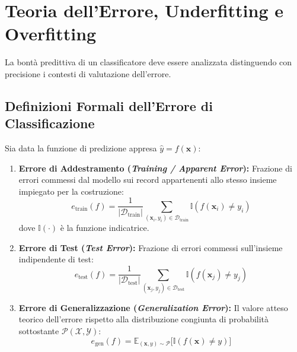 \FloatBarrier
\section{Teoria dell'Errore, Underfitting e Overfitting}
\label{sec:dm-error-underfitting-overfitting}

La bontà predittiva di un classificatore deve essere analizzata distinguendo con precisione i contesti di valutazione dell'errore.

\FloatBarrier
\subsection{Definizioni Formali dell'Errore di Classificazione}
\label{subsec:dm-error-formal-definitions}

Sia data la funzione di predizione appresa $\hat{y} = f(\mathbf{x})$:
\begin{enumerate}
    \item \textbf{Errore di Addestramento (\textit{Training / Apparent Error}):}
    Frazione di errori commessi dal modello sui record appartenenti allo stesso insieme impiegato per la costruzione:
    \begin{equation}
        e_{\text{train}}(f) = \frac{1}{|\mathcal{D}_{\text{train}}|} \sum_{(\mathbf{x}_i, y_i) \in \mathcal{D}_{\text{train}}} \mathbb{I}(f(\mathbf{x}_i) \ne y_i)
    \end{equation}
    dove $\mathbb{I}(\cdot)$ è la funzione indicatrice.
    
    \item \textbf{Errore di Test (\textit{Test Error}):}
    Frazione di errori commessi sull'insieme indipendente di test:
    \begin{equation}
        e_{\text{test}}(f) = \frac{1}{|\mathcal{D}_{\text{test}}|} \sum_{(\mathbf{x}_j, y_j) \in \mathcal{D}_{\text{test}}} \mathbb{I}(f(\mathbf{x}_j) \ne y_j)
    \end{equation}
    
    \item \textbf{Errore di Generalizzazione (\textit{Generalization Error}):}
    Il valore atteso teorico dell'errore rispetto alla distribuzione congiunta di probabilità sottostante $\mathcal{P}(\mathcal{X}, \mathcal{Y})$:
    \begin{equation}
        e_{\text{gen}}(f) = \mathbb{E}_{(\mathbf{x}, y) \sim \mathcal{P}}\big[ \mathbb{I}(f(\mathbf{x}) \ne y) \big]
    \end{equation}
\end{enumerate}

